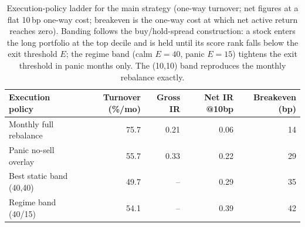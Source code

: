 \begin{table}[H]
\centering
\footnotesize
\begin{tabular}{l r r r r}
\toprule
Execution policy & Turnover (\%/mo) & Gross IR & Net IR @10bp & Breakeven (bp) \\
\midrule
Monthly full rebalance & 75.7 & 0.21 & 0.06 & 14 \\
Panic no-sell overlay & 55.7 & 0.33 & 0.22 & 29 \\
Best static band (40,40) & 49.7 & -- & 0.29 & 35 \\
Regime band (40/15) & 54.1 & -- & 0.39 & 42 \\
\bottomrule
\end{tabular}
\caption{Execution-policy ladder for the main strategy (one-way turnover; net figures at a flat 10\,bp one-way cost; breakeven is the one-way cost at which net active return reaches zero). Banding follows the buy/hold-spread construction: a stock enters the long portfolio at the top decile and is held until its score rank falls below the exit threshold $E$; the regime band (calm $E=40$, panic $E=15$) tightens the exit threshold in panic months only. The (10,10) band reproduces the monthly rebalance exactly.}
\label{tab:cost_policies}
\end{table}
